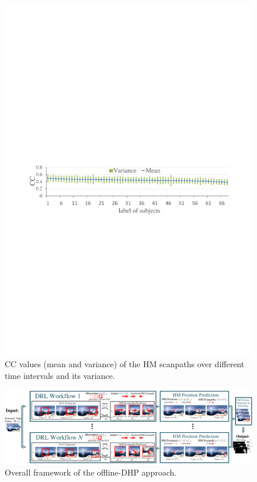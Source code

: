 \documentclass[10pt,journal,compsoc]{IEEEtran}
\begin{document}
\begin{figure}
	\begin{center}
		\centerline{\includegraphics[width=.95\columnwidth]{figures/database/consi_on_time}}%
        \vspace{-1em}
		\caption{\footnotesize{CC values (mean and variance) of the HM scanpaths over different time intervals and its variance. }}
		\label{consi_on_time}
	\end{center}
\vspace{-2.5em}
\end{figure}

\begin{figure}
	\begin{center}
        \vspace{-1em}
		\centerline{\includegraphics[width=2.0\columnwidth]{figures/dhp_approach/main_framework}}%
        \vspace{-1em}
		\caption{\footnotesize{Overall framework of the offline-DHP approach.}}
		\label{main-framework}
	\end{center}
\vspace{-1em}
\end{figure}
\end{document}
